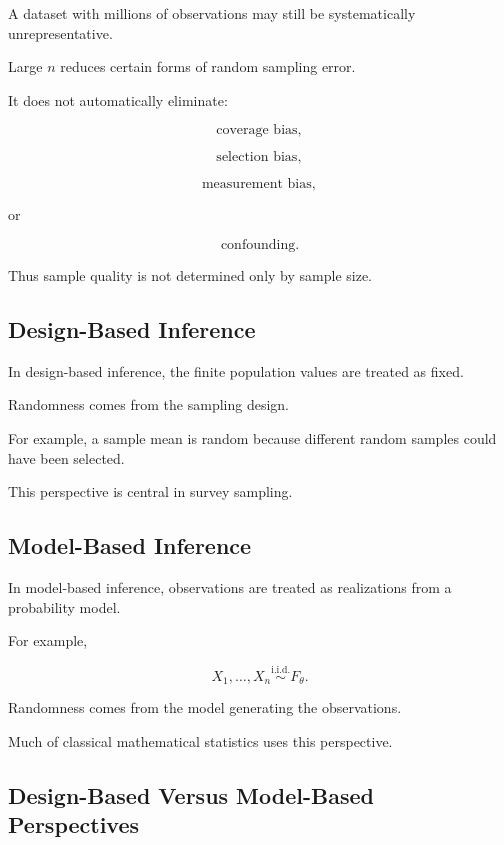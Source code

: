 A dataset with millions of observations may still be systematically
unrepresentative.

Large \(n\) reduces certain forms of random sampling error.

It does not automatically eliminate:

\[
\boxed{
\text{coverage bias},
}
\]

\[
\boxed{
\text{selection bias},
}
\]

\[
\boxed{
\text{measurement bias},
}
\]

or

\[
\boxed{
\text{confounding}.
}
\]

Thus sample quality is not determined only by sample size.

\subsection{Design-Based Inference}
\label{subsec:design-based-inference}

In design-based inference, the finite population values are treated as
fixed.

Randomness comes from the sampling design.

For example, a sample mean is random because different random samples
could have been selected.

This perspective is central in survey sampling.

\subsection{Model-Based Inference}
\label{subsec:model-based-inference}

In model-based inference, observations are treated as realizations from a
probability model.

For example,

\[
X_1,\ldots,X_n
\overset{\text{i.i.d.}}{\sim}
F_\theta.
\]

Randomness comes from the model generating the observations.

Much of classical mathematical statistics uses this perspective.

\subsection{Design-Based Versus Model-Based Perspectives}
\label{subsec:design-model-comparison}


